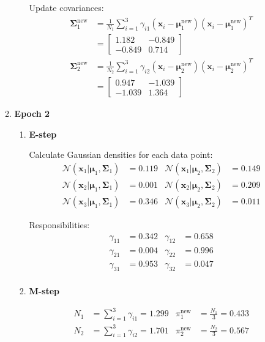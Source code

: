 \documentclass{article}
\begin{document}
\begin{enumerate}[leftmargin=\labelsep]
\begin{enumerate}
\begin{enumerate}
Update covariances:
\begin{align*}
\boldsymbol{\Sigma}_1^{\text{new}} &= \frac{1}{N_1}\sum_{i=1}^3 \gamma_{i1}(\mathbf{x}_i-\boldsymbol{\mu}_1^{\text{new}})(\mathbf{x}_i-\boldsymbol{\mu}_1^{\text{new}})^T \\
&= \begin{bmatrix} 1.182 & -0.849 \\ -0.849 & 0.714 \end{bmatrix} \\
\boldsymbol{\Sigma}_2^{\text{new}} &= \frac{1}{N_2}\sum_{i=1}^3 \gamma_{i2}(\mathbf{x}_i-\boldsymbol{\mu}_2^{\text{new}})(\mathbf{x}_i-\boldsymbol{\mu}_2^{\text{new}})^T \\
&= \begin{bmatrix} 0.947 & -1.039 \\ -1.039 & 1.364 \end{bmatrix}
\end{align*}

\end{enumerate}
\item \textbf{Epoch 2}
\begin{enumerate}
\item \textbf{E-step}

Calculate Gaussian densities for each data point:
\begin{align*}
\mathcal{N}(\mathbf{x}_1|\boldsymbol{\mu}_1,\boldsymbol{\Sigma}_1) &= 0.119 &
\mathcal{N}(\mathbf{x}_1|\boldsymbol{\mu}_2,\boldsymbol{\Sigma}_2) &= 0.149 \\
\mathcal{N}(\mathbf{x}_2|\boldsymbol{\mu}_1,\boldsymbol{\Sigma}_1) &= 0.001 &
\mathcal{N}(\mathbf{x}_2|\boldsymbol{\mu}_2,\boldsymbol{\Sigma}_2) &= 0.209 \\
\mathcal{N}(\mathbf{x}_3|\boldsymbol{\mu}_1,\boldsymbol{\Sigma}_1) &= 0.346 &
\mathcal{N}(\mathbf{x}_3|\boldsymbol{\mu}_2,\boldsymbol{\Sigma}_2) &= 0.011
\end{align*}

Responsibilities:
\begin{align*}
\gamma_{11} &= 0.342 & \gamma_{12} &= 0.658 \\
\gamma_{21} &= 0.004 & \gamma_{22} &= 0.996 \\
\gamma_{31} &= 0.953 & \gamma_{32} &= 0.047 \\
\end{align*}
\newpage
\item \textbf{M-step}

\begin{align*}
N_1 &= \sum_{i=1}^3 \gamma_{i1} = 1.299 & \pi_1^{\text{new}} &= \frac{N_1}{3} = 0.433 \\
N_2 &= \sum_{i=1}^3 \gamma_{i2} = 1.701 & \pi_2^{\text{new}} &= \frac{N_2}{3} = 0.567
\end{align*}


\end{enumerate}
\end{enumerate}
\end{enumerate}
\end{document}
